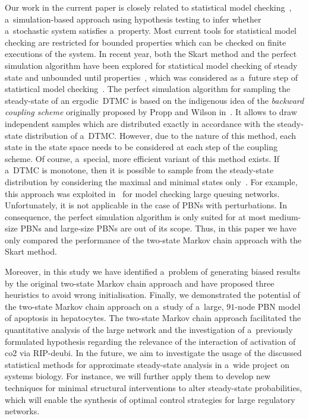 \documentclass[runningheads,a4paper]{llncs}
\newcommand{\complex}[1]{{\fontfamily{lmss}\selectfont co#1}}
\newcommand{\node}[1]{{\fontfamily{lmss}\selectfont #1}}
\begin{document}
Our work in the current paper is closely related to statistical model checking~\cite{YS02,SVA05},
a~simulation-based approach using hypothesis testing to infer whether a~stochastic system
satisfies a~property. Most current tools for statistical model checking are restricted for bounded
properties which can be checked on finite executions of the system. In recent year, both the Skart
method and the perfect simulation algorithm have been explored for statistical model checking of
steady state and unbounded until properties~\cite{RP09,Roh13}, which was considered as a~future
step of statistical model checking~\cite{LDB10}. The perfect simulation algorithm for sampling the
steady-state of an ergodic~DTMC is based on the indigenous idea of the \emph{backward coupling
scheme} originally proposed by Propp and Wilson in~\cite{PW96}. It allows to draw independent
samples which are distributed exactly in accordance with the steady-state distribution of a~DTMC.
However, due to the nature of this method, each state in the state space needs to be considered at
each step of the coupling scheme. Of course, a~special, more efficient variant of this method
exists. If a~DTMC is monotone, then it is possible to sample from the steady-state distribution
by considering the maximal and minimal states only~\cite{PW96,BGV08}. For example, this approach
was exploited in~\cite{RP09} for model checking large queuing networks. Unfortunately, it is not
applicable in the case of PBNs with perturbations. In consequence, the perfect simulation
algorithm is only suited for at most medium-size PBNs and large-size PBNs are out of its scope.
Thus, in this paper we have only compared the performance of the two-state Markov chain approach
with the Skart method.

Moreover, in this study we have identified a~problem of generating biased results by the original
two-state Markov chain approach and have proposed three heuristics to avoid wrong initialisation.
Finally, we demonstrated the potential of the two-state Markov chain approach on a~study of
a~large, $91$-node PBN model of apoptosis in hepatocytes. The two-state Markov chain approach
facilitated the quantitative analysis of the large network and the investigation of a~previously
formulated hypothesis regarding the relevance of the interaction of activation of \complex{2} via
\node{RIP-deubi}. In the future, we aim to investigate the usage of the discussed statistical
methods for approximate steady-state analysis in a~wide project on systems biology. For instance,
we will further apply them to develop new techniques for minimal structural interventions to alter
steady-state probabilities, which will enable the synthesis of optimal control strategies for
large regulatory networks.
\end{document}

